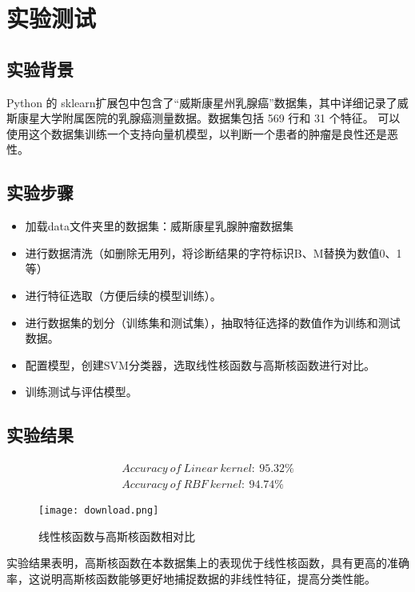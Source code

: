 
\chapter{\hei 实验测试}

\section{\hei 实验背景}
Python 的 sklearn扩展包中包含了“威斯康星州乳腺癌”数据集，其中详细记录了威斯康星大学附属医院的乳腺癌测量数据。数据集包括 569 行和 31 个特征。 可以使用这个数据集训练一个支持向量机模型，以判断一个患者的肿瘤是良性还是恶性。

\section{\hei 实验步骤}
\begin{itemize}
    \item 加载data文件夹里的数据集：威斯康星乳腺肿瘤数据集
    \item 进行数据清洗（如删除无用列，将诊断结果的字符标识B、M替换为数值0、1等）
    \item 进行特征选取（方便后续的模型训练）。
    \item 进行数据集的划分（训练集和测试集），抽取特征选择的数值作为训练和测试数据。
    \item 配置模型，创建SVM分类器，选取线性核函数与高斯核函数进行对比。
    \item 训练测试与评估模型。
\end{itemize}

\section{\hei 实验结果}
\begin{equation*}
\begin{aligned}
    Accuracy \ of \ Linear \ kernel: \ 95.32\%  \\
Accuracy \ of \ RBF \ kernel: \ 94.74\%
\end{aligned}
\end{equation*}

\begin{figure}[!h]
	\centering
	\texttt{[image: download.png]}
	\caption{线性核函数与高斯核函数相对比}
	\label{bfgs}
\end{figure}
{\hei 实验结果表明，高斯核函数在本数据集上的表现优于线性核函数，具有更高的准确率，这说明高斯核函数能够更好地捕捉数据的非线性特征，提高分类性能。}

